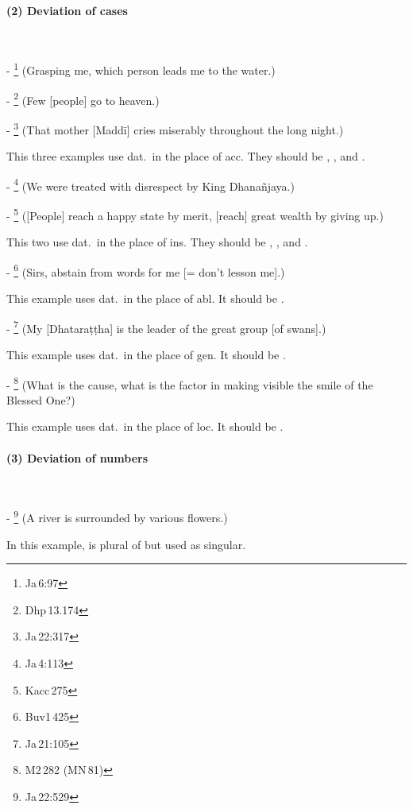 \paragraph*{(2) Deviation of cases}\ \par
- \footnote{Ja\,6:97} (Grasping me, which person leads me to the water.)\par
- \footnote{Dhp\,13.174} (Few [people] go to heaven.)\par
- \footnote{Ja\,22:317} (That mother [Madd\=i] cries miserably throughout the long night.)\par
This three examples use dat.\ in the place of acc. They should be , , and .\par
- \footnote{Ja\,4:113} (We were treated with disrespect by King Dhana\~njaya.)\par
- \footnote{Kacc\,275} ([People] reach a happy state by merit, [reach] great wealth by giving up.)\par
This two use dat.\ in the place of ins. They should be , , and .\par
- \footnote{Buv1\,425} (Sirs, abstain from words for me [= don't lesson me].)\par
This example uses dat.\ in the place of abl. It should be .\par
- \footnote{Ja\,21:105} (My [Dhatara\d t\d tha] is the leader of the great group [of swans].)\par
This example uses dat.\ in the place of gen. It should be .\par
- \footnote{M2\,282 (MN\,81)} (What is the cause, what is the factor in making visible the smile of the Blessed One?)\par
This example uses dat.\ in the place of loc. It should be .\par

\paragraph*{(3) Deviation of numbers}\ \par
- \footnote{Ja\,22:529} (A river is surrounded by various flowers.)\par
In this example,  is plural of  but used as singular.

